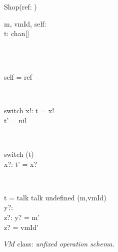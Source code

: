 \begin{figure}[H]
\centering
\begin{class}{Shop(ref: \integer)}
\\
\begin{state}
m, vmId, self: \integer
\\t: chan[\integer \times \integer]
\end{state} 
\\
\begin{init}
\\self = ref
\end{init} 
\\
\begin{op}{switch}
x!: \integer
\ST
t = x!
\\t' = nil
\end{op}
\\
\begin{op}{switch}
\Delta (t)
\\x?: \integer
\ST
t' = x?
\end{op}
\\
\begin{op}{ t = talk  talk  undefined}
\Delta (m,vmId)
\\y?: \integer
\\z?: \integer
\ST
y? = m'
\\z? = vmId'
\end{op}
\end{class}
\caption{$VM$ class: \textit{unfixed operation schema.}}
\label{oz_unfixed_operation_schema_shop}
\end{figure}